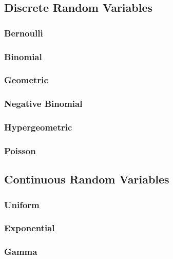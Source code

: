 \documentclass[a4paper,10pt]{article}
\begin{document}
\subsection{Discrete Random Variables}

\subsubsection{Bernoulli}

\subsubsection{Binomial}

\subsubsection{Geometric}

\subsubsection{Negative Binomial}

\subsubsection{Hypergeometric}

\subsubsection{Poisson}


\subsection{Continuous Random Variables}

\subsubsection{Uniform}

\subsubsection{Exponential}

\subsubsection{Gamma}
\end{document}
